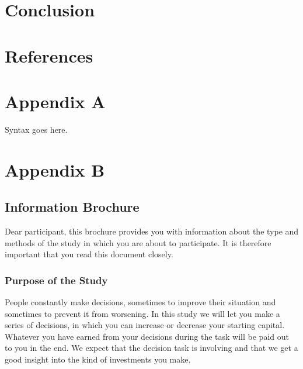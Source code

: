 \documentclass[
  man]{apa6}
\begin{document}
\hypertarget{conclusion}{%
\section{Conclusion}\label{conclusion}}

\newpage

\hypertarget{references}{%
\section{References}\label{references}}

\begingroup
\setlength{\parindent}{-0.5in}
\setlength{\leftskip}{0.5in}

\hypertarget{refs}{}

\endgroup

\newpage

\hypertarget{appendix-a}{%
\section{Appendix A}\label{appendix-a}}

Syntax goes here.

\newpage

\hypertarget{appendix-b}{%
\section{Appendix B}\label{appendix-b}}

\hypertarget{information-brochure}{%
\subsection{Information Brochure}\label{information-brochure}}

Dear participant, this brochure provides you with information about the type and methods of the study in which you are about to participate. It is therefore important that you read this document closely.

\hypertarget{purpose-of-the-study}{%
\subsubsection{Purpose of the Study}\label{purpose-of-the-study}}

People constantly make decisions, sometimes to improve their situation and sometimes to prevent it from worsening. In this study we will let you make a series of decisions, in which you can increase or decrease your starting capital. Whatever you have earned from your decisions during the task will be paid out to you in the end. We expect that the decision task is involving and that we get a good insight into the kind of investments you make.
\end{document}
